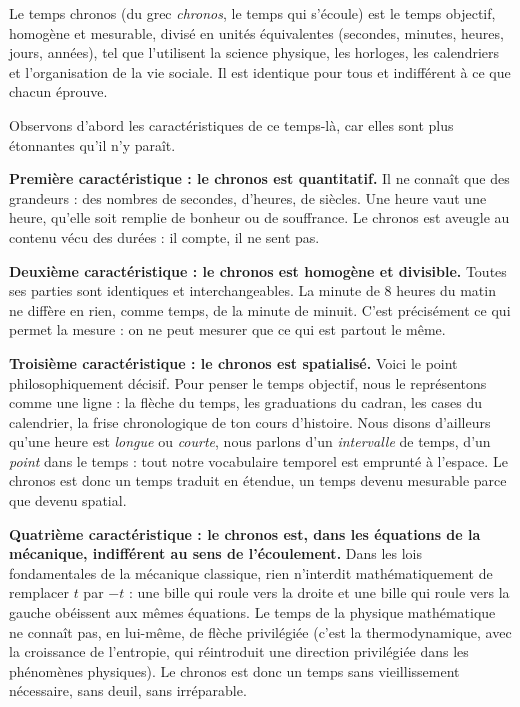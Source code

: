 \documentclass[11pt]{article}
\newcommand{\cle}[1]{{\popxbold\color{popdark}#1}}
\newcounter{popsec}
\newcounter{popsub}
\newcommand{\courssub}[1]{%
  \stepcounter{popsub}%
  \par\vspace{9pt}\noindent{\popxbold\fontsize{11.5}{13}\selectfont\color{popink}{\color{poporange}\thepopsec.\thepopsub}\hspace{6pt}#1}\par\nopagebreak\vspace{4pt}
}
\begin{document}
\courssub{Le temps objectif : le \emph{chronos}}

\begin{definition}
Le \cle{temps chronos} (du grec \emph{chronos}, le temps qui s'écoule) est le temps objectif, homogène et mesurable, divisé en unités équivalentes (secondes, minutes, heures, jours, années), tel que l'utilisent la science physique, les horloges, les calendriers et l'organisation de la vie sociale. Il est identique pour tous et indifférent à ce que chacun éprouve.
\end{definition}

Observons d'abord les caractéristiques de ce temps-là, car elles sont plus étonnantes qu'il n'y paraît.

\textbf{Première caractéristique : le chronos est quantitatif.} Il ne connaît que des grandeurs : des nombres de secondes, d'heures, de siècles. Une heure vaut une heure, qu'elle soit remplie de bonheur ou de souffrance. Le chronos est aveugle au contenu vécu des durées : il compte, il ne sent pas.

\textbf{Deuxième caractéristique : le chronos est homogène et divisible.} Toutes ses parties sont identiques et interchangeables. La minute de 8 heures du matin ne diffère en rien, comme temps, de la minute de minuit. C'est précisément ce qui permet la mesure : on ne peut mesurer que ce qui est partout le même.

\textbf{Troisième caractéristique : le chronos est spatialisé.} Voici le point philosophiquement décisif. Pour penser le temps objectif, nous le représentons comme une ligne : la flèche du temps, les graduations du cadran, les cases du calendrier, la frise chronologique de ton cours d'histoire. Nous disons d'ailleurs qu'une heure est \emph{longue} ou \emph{courte}, nous parlons d'un \emph{intervalle} de temps, d'un \emph{point} dans le temps : tout notre vocabulaire temporel est emprunté à l'espace. Le chronos est donc un temps traduit en étendue, un temps devenu mesurable parce que devenu spatial.

\textbf{Quatrième caractéristique : le chronos est, dans les équations de la mécanique, indifférent au sens de l'écoulement.} Dans les lois fondamentales de la mécanique classique, rien n'interdit mathématiquement de remplacer $t$ par $-t$ : une bille qui roule vers la droite et une bille qui roule vers la gauche obéissent aux mêmes équations. Le temps de la physique mathématique ne connaît pas, en lui-même, de flèche privilégiée (c'est la thermodynamique, avec la croissance de l'entropie, qui réintroduit une direction privilégiée dans les phénomènes physiques). Le chronos est donc un temps sans vieillissement nécessaire, sans deuil, sans irréparable.
\end{document}
